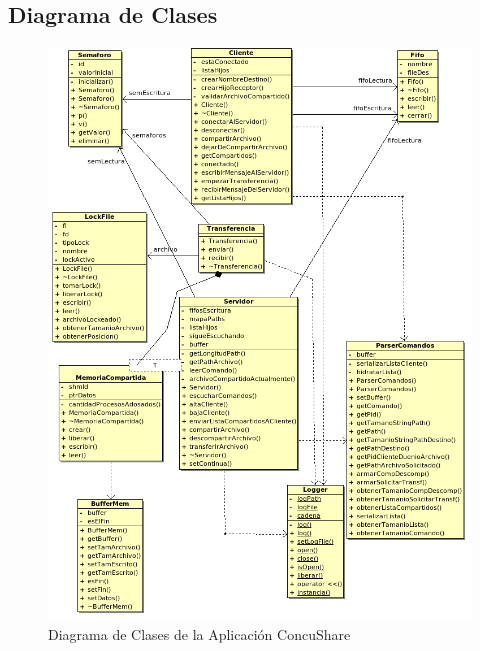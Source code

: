 \documentclass[a4paper,10pt]{article}
\begin{document}
		\subsection{Diagrama de Clases}
			\begin{figure}[!htpb]
				\centering
				\includegraphics[width=12cm]{dclases.png}
				\caption{Diagrama de Clases de la Aplicaci\'on ConcuShare} \label{Img001}
			\end{figure}
		
			
			
		
		

				
\end{document}
